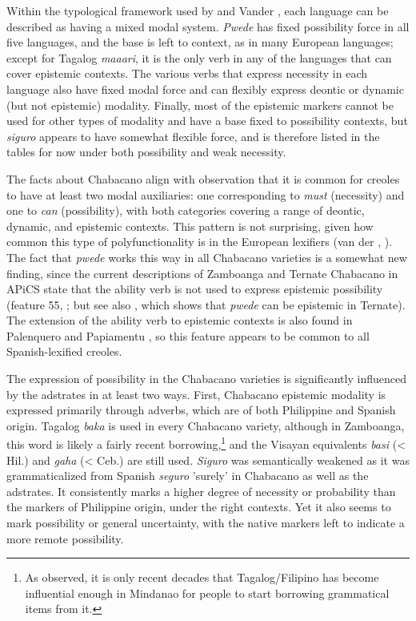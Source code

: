 Within the typological framework used by \citet{MatthewsonEtAl2005} and Vander \citet{Klok2013}, each language can be described as having a mixed modal system. \textit{Pwede} has fixed possibility force in all five languages, and the base is left to context, as in many European languages; except for Tagalog \textit{maaari}, it is the only verb in any of the languages that can cover epistemic contexts. The various verbs that express necessity in each language also have fixed modal force and can flexibly express deontic or dynamic (but not epistemic) modality. Finally, most of the epistemic markers cannot be used for other types of modality and have a base fixed to possibility contexts, but \textit{siguro} appears to have somewhat flexible force, and is therefore listed in the tables for now under both possibility and weak necessity. 

The facts about Chabacano align with  observation that it is common for creoles to have at least two modal auxiliaries: one corresponding to \textit{must} (necessity) and one to \textit{can} (possibility), with both categories covering a range of deontic, dynamic, and epistemic contexts. This pattern is not surprising, given how common this type of polyfunctionality is in the European lexifiers (van der \citealt{AuweraEtAl2005}, \citealt{MatthewsonEtAl2005}). The fact that \textit{pwede} works this way in all Chabacano varieties is a somewhat new finding, since the current descriptions of Zamboanga and Ternate Chabacano in APiCS state that the ability verb is not used to express epistemic possibility (feature 55, \citealt{MaurerEtAl2013}; but see also \citealt{Sippola2011}, which shows that \textit{pwede} can be epistemic in Ternate). The extension of the ability verb to epistemic contexts is also found in Palenquero and Papiamentu \citep{MaurerEtAl2013}, so this feature appears to be common to all Spanish-lexified creoles. 

The expression of possibility in the Chabacano varieties is significantly influenced by the adstrates in at least two ways. First, Chabacano epistemic modality is expressed primarily through adverbs, which are of both Philippine and Spanish origin. Tagalog \textit{baka} is used in every Chabacano variety, although in Zamboanga, this word is likely a fairly recent borrowing,\footnote{As \citet[461]{Lipski2013} observed, it is only recent decades that Tagalog/Filipino has become influential enough in Mindanao for people to start borrowing grammatical items from it.} and the Visayan equivalents \textit{basi} (< Hil.) and \textit{gaha} (< Ceb.) are still used. \textit{Siguro} was semantically weakened as it was grammaticalized from Spanish \textit{seguro} {}'surely' in Chabacano as well as the adstrates. It consistently marks a higher degree of necessity or probability than the markers of Philippine origin, under the right contexts. Yet it also seems to mark possibility or general uncertainty, with the native markers left to indicate a more remote possibility. 

